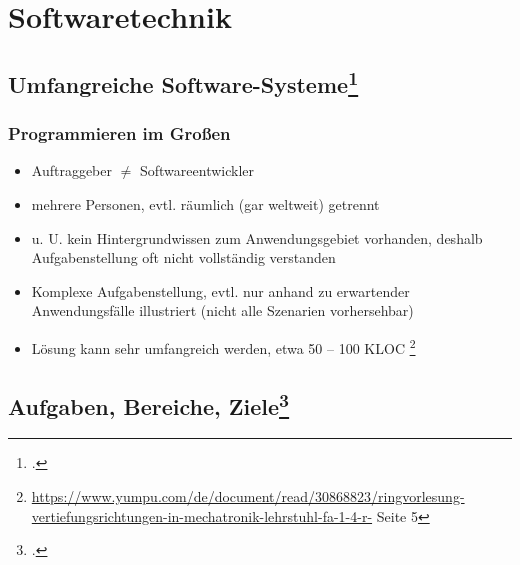 \documentclass{lehramt-informatik}
\begin{document}

\chapter{Softwaretechnik}

%

\section{Umfangreiche Software-Systeme\footcite[Seite 6]{sosy:fs:1}}

\subsection{Programmieren im Großen}

\begin{itemize}
\item Auftraggeber $\neq$ Softwareentwickler

\item mehrere Personen, evtl. räumlich (gar weltweit) getrennt

\item u. U. kein Hintergrundwissen zum Anwendungsgebiet vorhanden,
deshalb Aufgabenstellung oft nicht vollständig verstanden

\item Komplexe Aufgabenstellung, evtl. nur anhand zu erwartender
Anwendungsfälle illustriert (nicht alle Szenarien vorhersehbar)

\item Lösung kann sehr umfangreich werden, etwa 50 – 100 KLOC
\footnote{\url{https://www.yumpu.com/de/document/read/30868823/ringvorlesung-vertiefungsrichtungen-in-mechatronik-lehrstuhl-fa-1-4-r-} Seite 5}
\end{itemize}

%

\section{Aufgaben, Bereiche, Ziele\footcite[Seite 8]{sosy:fs:1}}
\end{document}
